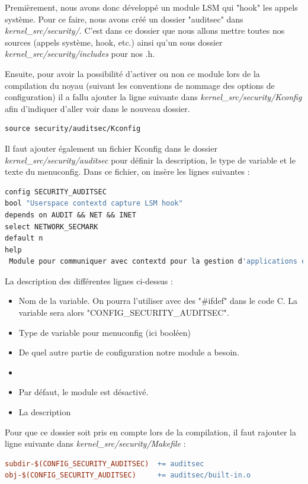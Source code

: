 \documentclass[pdftex,a4paper,titlepage,11pt]{article}
\begin{document}
Premièrement, nous avons donc développé un module LSM qui "hook" les appels système. Pour ce faire, nous avons créé un dossier "auditsec" dans \textit{{kernel\_src}/security/}. C'est dans ce dossier que nous allons mettre toutes nos sources (appels système, hook, etc.) ainsi qu'un sous dossier \textit{{kernel\_src}/security/includes} pour nos .h.  

Ensuite,  pour avoir la possibilité d'activer ou non ce module lors de la compilation du noyau (suivant les conventions de nommage des options de configuration) il a fallu ajouter la ligne suivante dans \textit{{kernel\_src}/security/Kconfig} afin d'indiquer d'aller voir dans le nouveau dossier.


\begin{lstlisting}[language=make]
source security/auditsec/Kconfig
\end{lstlisting}

Il faut ajouter également un fichier Kconfig dans le dossier \textit{{kernel\_src}/security/auditsec} pour définir la description, le type de variable et le texte du menuconfig. Dans ce fichier, on insère les lignes suivantes :

\begin{lstlisting}[language=make]
config SECURITY_AUDITSEC
bool "Userspace contextd capture LSM hook"
depends on AUDIT && NET && INET
select NETWORK_SECMARK
default n
help
 Module pour communiquer avec contextd pour la gestion d'applications en userspace.
\end{lstlisting}

La description des différentes lignes ci-dessus :
\begin{itemize}
	\item Nom de la variable. On pourra l'utiliser avec des "\#ifdef" dans le code C. La variable sera alors "CONFIG\_SECURITY\_AUDITSEC".
	\item Type de variable pour menuconfig (ici booléen)
	\item De quel autre partie de configuration notre module a besoin.
	\item
	\item Par défaut, le module est désactivé.
	\item La description
\end{itemize}

 Pour que ce dossier soit pris en compte lors de la compilation, il faut rajouter la ligne suivante dans \textit{{kernel\_src}/security/Makefile} :

\begin{lstlisting}[language=make]
subdir-$(CONFIG_SECURITY_AUDITSEC)  += auditsec	
obj-$(CONFIG_SECURITY_AUDITSEC)     += auditsec/built-in.o
\end{lstlisting}
\end{document}
